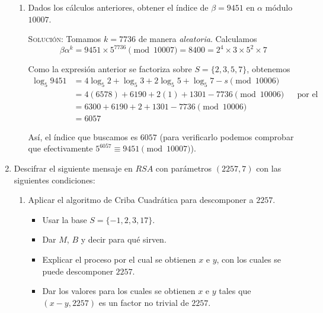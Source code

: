 \documentclass[letterpaper,11pt]{article}
\begin{document}
\begin{enumerate}
\begin{enumerate}
        \item Dados los cálculos anteriores, obtener el índice de $\beta = 9451$
        en $\alpha$ módulo $10007$.
        
        \textsc{Solución:} Tomamos $k = 7736$ de manera \textit{aleatoria}.
        Calculamos
        \begin{equation*}
            \beta \alpha^{k} = 9451 \times 5^{7736} \pmod{10007} = 8400
            = 2^{4} \times 3 \times 5^{2} \times 7  
        \end{equation*}
        
        Como la expresión anterior se factoriza sobre $S = \{2, 3, 5, 7\}$,
        obtenemos 
        \begin{align*}
            \log_{5} 9451 
            &= 4 \log_{5} 2 + \log_{5} 3 + 2 \log_{5} 5 + \log_{5} 7 - s
               \pmod{10006}\\
            &= 4 (6578) + 6190 + 2 (1) + 1301 - 7736 \pmod{10006}
            && \text{por el inciso anterior} \\ 
            &= 6300 + 6190 + 2 + 1301 - 7736 \pmod{10006} \\
            &= 6057
        \end{align*}
        
        Así, el índice que buscamos es $6057$ (para verificarlo podemos 
        comprobar que efectivamente $5^{6057} \equiv 9451 \pmod{10007}$). 
    \end{enumerate}

    \item Descifrar el siguiente mensaje en $RSA$ con parámetros $(2257, 7)$ 
    con las siguientes condiciones:
    \begin{enumerate}
        \item Aplicar el algoritmo de Criba Cuadrática para descomponer a $2257$.
        \begin{itemize}
            \item Usar la base $S = \{-1, 2, 3, 17\}$.
            \item Dar $M$, $B$ y decir para qué sirven.
            \item Explicar el proceso por el cual se obtienen $x$ e $y$, con los
            cuales se puede descomponer $2257$.
            \item Dar los valores para los cuales se obtienen $x$ e $y$ tales que
            $(x - y, 2257)$ es un factor no trivial de $2257$.
        \end{itemize}
        

\end{enumerate}
\end{enumerate}
\end{document}
